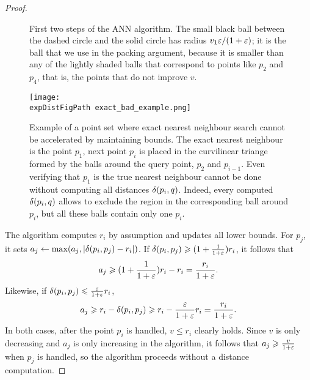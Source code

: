 \begin{proof}
\begin{figure}[ht!]
\caption{First two steps of the ANN algorithm. 
The small black ball between the dashed circle and the solid circle has radius $v_1 \varepsilon / (1 + \varepsilon)$; it is the ball that we use in the packing argument, because it is smaller than any of the lightly shaded balls that correspond to points like $p_2$ and $p_4$, that is, the points that do not improve $v$.}
\label{fig:ann_illustration}
\end{figure}


\begin{figure}[hb!]
    \texttt{[image: \\expDistFigPath exact\_bad\_example.png]}
    \caption{Example of a point set where exact nearest neighbour search cannot be accelerated by maintaining bounds.
    The exact nearest neighbour is the point $p_1$, next point $p_i$ is placed 
    in the curvilinear triange formed by the balls around the query point, $p_2$ and $p_{i-1}$. Even verifying that $p_1$
    is the true nearest neighbour cannot be done without computing all distances $\delta(p_i,q)$. Indeed, every computed
    $\delta(p_i,q)$ allows to exclude the region in the corresponding ball around $p_i$, but all these balls contain only one $p_i$.}
    \label{fig:exact_bad_example}
\end{figure}


The algorithm computes $r_i$ by assumption and updates
all lower bounds. For $p_j$, it sets $a_j\gets \max (a_j,|\delta(p_i,p_j)-r_i|)$.
If $\delta(p_i,p_j)\geqslant (1+\frac{1}{1+\varepsilon})r_i$, it follows that 
\[a_j\geqslant (1+\frac{1}{1+\varepsilon})r_i - r_i = \frac{r_i}{1+\varepsilon}.\]
Likewise, if $\delta(p_i,p_j)\leqslant\frac{\varepsilon}{1+\varepsilon}r_i$,
\[a_j\geqslant r_i-\delta(p_i,p_j) \geqslant r_i - \frac{\varepsilon}{1+\varepsilon}r_i = \frac{r_i}{1+\varepsilon}.\]
In both cases, after the point $p_i$ is handled,
$v\leq r_i$ clearly holds. Since $v$ is only decreasing
and $a_j$ is only increasing in the algorithm,
it follows that $a_j\geqslant \frac{v}{1+\varepsilon}$ when $p_j$ is handled,
so the algorithm proceeds without a distance computation.
\end{proof}

